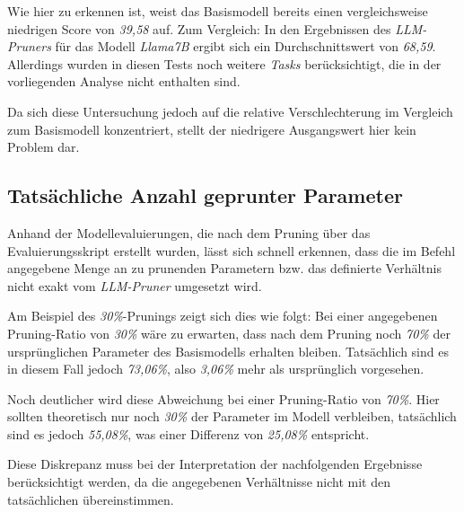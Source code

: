 Wie hier zu erkennen ist, weist das Basismodell bereits einen vergleichsweise
niedrigen Score von \emph{39,58} auf. Zum Vergleich: In den Ergebnissen des
\emph{LLM-Pruners} für das Modell \emph{Llama7B} ergibt sich ein
Durchschnittswert von \emph{68,59}. Allerdings wurden in diesen Tests noch
weitere \emph{Tasks} berücksichtigt, die in der vorliegenden Analyse nicht
enthalten sind.

Da sich diese Untersuchung jedoch auf die relative Verschlechterung im Vergleich
zum Basismodell konzentriert, stellt der niedrigere Ausgangswert hier kein
Problem dar.

\subsection{Tatsächliche Anzahl geprunter Parameter}\label{param_count}

Anhand der Modellevaluierungen, die nach dem Pruning über das Evaluierungsskript
erstellt wurden, lässt sich schnell erkennen, dass die im Befehl angegebene
Menge an zu prunenden Parametern bzw. das definierte Verhältnis nicht exakt vom
\emph{LLM-Pruner} umgesetzt wird.

Am Beispiel des \emph{30\%}-Prunings zeigt sich dies wie folgt: Bei einer
angegebenen Pruning-Ratio von \emph{30\%} wäre zu erwarten, dass nach dem
Pruning noch \emph{70\%} der ursprünglichen Parameter des Basismodells erhalten
bleiben. Tatsächlich sind es in diesem Fall jedoch \emph{73,06\%}, also
\emph{3,06\%} mehr als ursprünglich vorgesehen.

Noch deutlicher wird diese Abweichung bei einer Pruning-Ratio von \emph{70\%}.
Hier sollten theoretisch nur noch \emph{30\%} der Parameter im Modell
verbleiben, tatsächlich sind es jedoch \emph{55,08\%}, was einer Differenz von
\emph{25,08\%} entspricht.

Diese Diskrepanz muss bei der Interpretation der nachfolgenden Ergebnisse
berücksichtigt werden, da die angegebenen Verhältnisse nicht mit den
tatsächlichen übereinstimmen.

\begin{table}[h]
	\centering
	\caption{Anzahl der vorhandenen Parameter nach dem Pruning}
	\label{tab:actualparameters}
\end{table}


